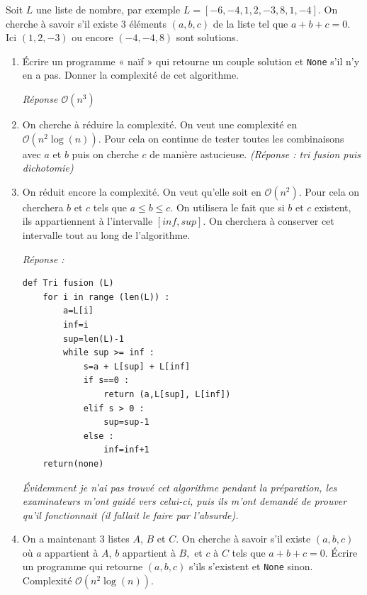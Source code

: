 \documentclass[10pt,fleqn]{article} %
\begin{document}
\begin{multicols}{2}
Soit $L$ une liste de nombre, par exemple $L= [-6,-4,1,2,-3,8,1,-4]$. 
On cherche à savoir s’il existe 3 éléments $(a,b,c)$ de la liste tel que $a+b+c=0$.
Ici $(1,2,-3)$ ou encore $(-4,-4,8)$ sont solutions.

\begin{enumerate}
\item Écrire un programme « naïf » qui retourne un couple solution et \texttt{None} s’il n’y en a pas. 
Donner la complexité de cet algorithme.

\textit{Réponse $\mathcal{O}(n^3)$}

\item On cherche à réduire la complexité. On veut une complexité en $\mathcal{O}\left(n^2\log(n)\right)$. Pour cela on continue de tester toutes les combinaisons avec $a$ et $b$ puis on cherche $c$ de manière astucieuse. \textit{(Réponse : tri fusion puis dichotomie) }
\item On réduit encore la complexité. On veut qu’elle soit en $\mathcal{O}(n^2)$. 
Pour cela on cherchera $b$ et $c$ tels que $a\leq b\leq c$. On utilisera le fait que si $b$ et $c$ existent, ils appartiennent à l’intervalle $[inf,sup]$. On cherchera à conserver cet intervalle tout au long de l’algorithme. 

\textit{Réponse :}
\begin{lstlisting}
def Tri fusion (L)
    for i in range (len(L)) :
        a=L[i]
        inf=i
        sup=len(L)-1
        while sup >= inf :
            s=a + L[sup] + L[inf]
            if s==0 :
                return (a,L[sup], L[inf]) 
            elif s > 0 :
                sup=sup-1
            else :
                inf=inf+1
    return(none)
\end{lstlisting}
\textit{Évidemment je n’ai pas trouvé cet algorithme pendant la préparation, les examinateurs m’ont guidé vers celui-ci, puis ils m’ont demandé de prouver qu’il fonctionnait (il fallait le faire par l’absurde).} 

\item On a maintenant 3 listes $A$, $B$ et $C$. On cherche à savoir s’il existe $(a,b,c)$ où $a$ appartient à $A$, $b$ appartient à $B,$ et $c$ à $C$ tels que $a+b+c=0$.
Écrire un programme qui retourne $(a,b,c)$ s’ils s’existent et \texttt{None} sinon. Complexité $\mathcal{O}(n^2\log (n))$. 



\end{enumerate}
\end{multicols}
\end{document}
